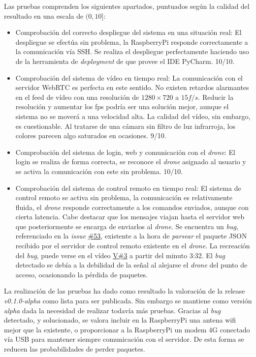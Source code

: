 Las pruebas comprenden los siguientes apartados, puntuados según la calidad del resultado en una escala de $(0, 10]$: 
\begin{itemize}
\item Comprobación del correcto despliegue del sistema en una situación real: El despliegue se efectúa sin problema, la RaspberryPi responde correctamente a la comunicación vía SSH. Se realiza el despliegue perfectamente haciendo uso de la herramienta de \emph{deployment} de que provee el IDE PyCharm. 10/10.
\item Comprobación del sistema de vídeo en tiempo real: La comunicación con el servidor WebRTC es perfecta en este sentido. No existen retardos alarmantes en el feed de vídeo con una resolución de $1280 \times 720$ a $15f/s$. Reducir la resolución y aumentar los fps podría ser una solución mejor, aunque el sistema no se moverá a una velocidad alta. La calidad del vídeo, sin embargo, es cuestionable. Al tratarse de una cámara sin filtro de luz infrarroja, los colores parecen algo saturados en ocasiones.  9/10.
\item Comprobación del sistema de login, web y comunicación con el \emph{drone}: El login se realiza de forma correcta, se reconoce el \emph{drone} asignado al usuario y se activa la comunicación con este sin problema. 10/10.
\item Comprobación del sistema de control remoto en tiempo real: El sistema de control remoto se activa sin problema, la comunicación es relativamente fluida, el \emph{drone} responde correctamente a los comandos enviados, aunque con cierta latencia. Cabe destacar que los mensajes viajan hasta el servidor web que posteriormente se encarga de enviarlos al \emph{drone}. 
Se encuentra un \emph{bug}, referenciado en la \emph{issue} \href{https://github.com/mbm0089/GII_0_17.02_SNSI/issues/53}{\#53}, existente a la hora de \emph{parsear} el paquete JSON recibido por el servidor de control remoto existente en el \emph{drone}. La recreación del \emph{bug}, puede verse en el vídeo \href{https://universidaddeburgos-my.sharepoint.com/:v:/g/personal/mbm0089_alu_ubu_es/ERit03PQ4GVJvVXNLCxQQwUBUjZt6VjCwl5GcLUYwFQGPQ?e=dD258g}{V\#3} a partir del minuto 3:32. 
El \emph{bug} detectado se debía a la debilidad de la señal al alejarse el \emph{drone} del punto de acceso, ocasionando la pérdida de paquetes.
\end{itemize}

La realización de las pruebas ha dado como resultado la valoración de la release \emph{v0.1.0-alpha} como lista para ser publicada. Sin embargo se mantiene como versión \emph{alpha} dada la necesidad de realizar todavía más pruebas. 
Gracias al \emph{bug} detectado, y solucionado, se valora incluir en la RaspberryPi una antena wifi mejor que la existente, o proporcionar a la RaspberryPi un modem 4G conectado vía USB para mantener siempre comunicación con el servidor. De esta forma se reducen las probabilidades de perder paquetes. 


